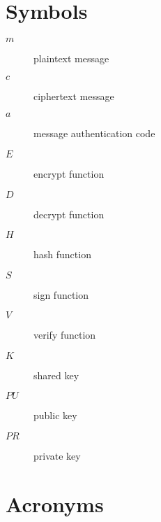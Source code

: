 \chapter{Symbols}

\begin{description}
  \item[$m$] plaintext message
  \item[$c$] ciphertext message
  \item[$a$] message authentication code
  \item[$E$] encrypt function
  \item[$D$] decrypt function
  \item[$H$] hash function
  \item[$S$] sign function
  \item[$V$] verify function
  \item[$K$] shared key
  \item[$PU$] public key
  \item[$PR$] private key
\end{description}


\chapter{Acronyms}

